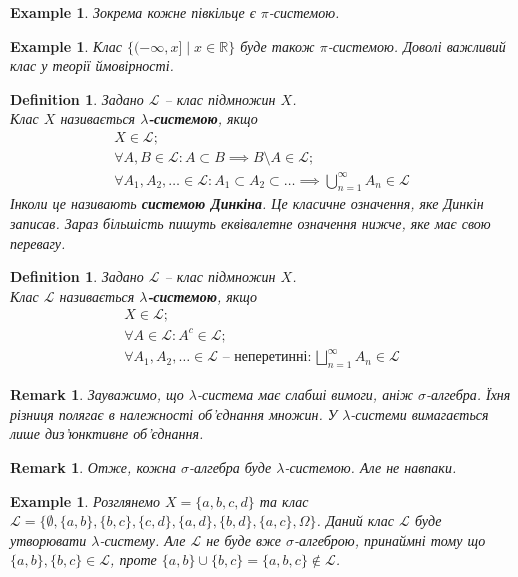 \documentclass[a4paper, 10pt]{article}
\theoremstyle{theoremdd}
\newtheorem{definition}[theorem]{Definition}
\newtheorem{example}[theorem]{Example}
\newtheorem{remark}[theorem]{Remark}
\begin{document}
\begin{example}
Зокрема кожне півкільце є $\pi$-системою.
\end{example}

\begin{example}
Клас $\{(-\infty,x] \mid x \in \mathbb{R}\}$ буде також $\pi$-системою. Доволі важливий клас у теорії ймовірності.
\end{example}

\begin{definition}
Задано $\mathcal{L}$ -- клас підмножин $X$.\\
Клас $X$ називається \textbf{$\lambda$-системою}, якщо
\begin{align*}
X \in \mathcal{L}; \\
\forall A,B \in \mathcal{L}: A \subset B \implies B \setminus A \in \mathcal{L}; \\
\forall A_1,A_2,\dots \in \mathcal{L}: A_1 \subset A_2 \subset \dots \implies \bigcup_{n=1}^\infty A_n \in \mathcal{L}
\end{align*}
Інколи це називають \textbf{системою Динкіна}. Це класичне означення, яке Динкін записав. Зараз більшість пишуть еквівалетне означення нижче, яке має свою перевагу.
\end{definition}

\begin{definition}
Задано $\mathcal{L}$ -- клас підмножин $X$.\\
Клас $\mathcal{L}$ називається \textbf{$\lambda$-системою}, якщо
\begin{align*}
X \in \mathcal{L}; \\
\forall A \in \mathcal{L}: A^c \in \mathcal{L}; \\
\forall A_1,A_2,\dots \in \mathcal{L} \text{ -- неперетинні}: \bigsqcup_{n=1}^\infty A_n \in \mathcal{L}
\end{align*}
\end{definition}

\begin{remark}
Зауважимо, що $\lambda$-система має слабші вимоги, аніж $\sigma$-алгебра. Їхня різниця полягає в належності об'єднання множин. У $\lambda$-системи вимагається лише диз'юнктивне об'єднання.
\end{remark}

\begin{remark}
Отже, кожна $\sigma$-алгебра буде $\lambda$-системою. Але не навпаки.
\end{remark}

\begin{example}
Розглянемо $X = \{a,b,c,d\}$ та клас $\mathcal{L} = \{\emptyset, \{a,b\}, \{b,c\}, \{c,d\}, \{a,d\}, \{b,d\}, \{a,c\}, \Omega\}$. Даний клас $\mathcal{L}$ буде утворювати $\lambda$-систему. Але $\mathcal{L}$ не буде вже $\sigma$-алгеброю, принаймні тому що $\{a,b\},\{b,c\} \in \mathcal{L}$, проте $\{a,b\} \cup \{b,c\} = \{a,b,c\} \notin \mathcal{L}$.
\end{example}
\end{document}
